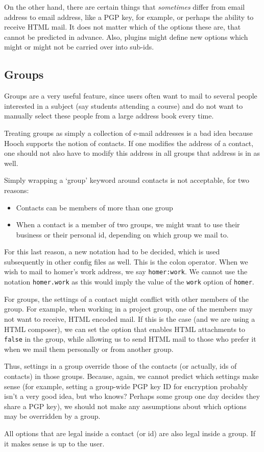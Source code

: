 \documentclass[a4paper]{article}
\begin{document}
On the other hand, there are certain things that \emph{sometimes} differ
from email address to email address, like a PGP key, for example, or
perhaps the ability to receive HTML mail.  It does not matter which of
the options these are, that cannot be predicted in advance.  Also, plugins
might define new options which might or might not be carried over into
sub-ids.


\subsection{Groups}

Groups are a very useful feature, since users often want to mail to
several people interested in a subject (say students attending a course)
and do not want to manually select these people from a large address
book every time.

Treating groups as simply a collection of e-mail addresses is a bad idea
because Hooch supports the notion of contacts.  If one modifies the
address of a contact, one should not also have to modify this address in
all groups that address is in as well.

Simply wrapping a `group' keyword around contacts is not acceptable, for
two reasons:
\begin{itemize}
\item Contacts can be members of more than one group
\item When a contact is a member of two groups, we might want to use
	their business or their personal id, depending on which group we
	mail to.
\end{itemize}
For this last reason, a new notation had to be decided, which is used
subsequently in other config files as well.  This is the colon
operator.  When we wish to mail to homer's work address, we say
\texttt{homer:work}.  We cannot use the notation \texttt{homer.work} as
this would imply the value of the \texttt{work} option of \texttt{homer}.

For groups, the settings of a contact might conflict with other members
of the group.  For example, when working in a project group, one of the
members may not want to receive, HTML encoded mail.  If this is the
case (and we are using a HTML composer), we can set the option that
enables HTML attachments to \texttt{false} in the group, while allowing
us to send HTML mail to those who prefer it when we mail them personally
or from another group.

Thus, settings in a group override those of the contacts (or actually,
ids of contacts) in those groups.  Because, again, we cannot predict
which settings make sense (for example, setting a group-wide PGP key ID for
encryption probably isn't a very good idea, but who knows?  Perhaps some
group one day decides they share a PGP key), we should not make any
assumptions about which options may be overridden by a group.

All options that are legal inside a contact (or id) are also legal
inside a group.  If it makes sense is up to the user.
\end{document}
